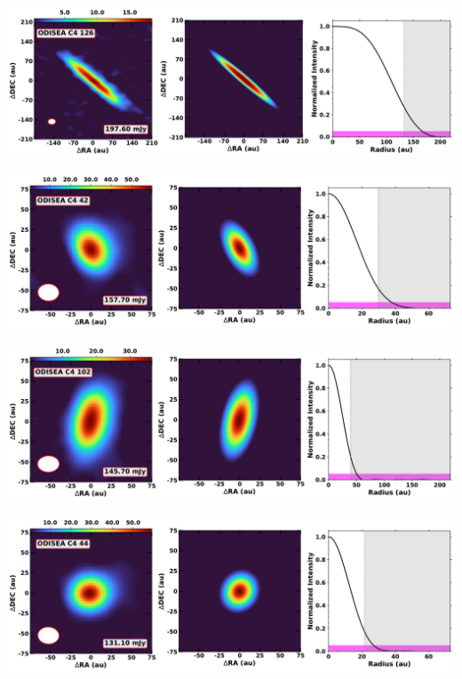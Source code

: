\noindent
\begin{minipage}{.49\textwidth}
	 \centering
	 	 \hrulesep
	 	 \includegraphics[width=1\linewidth]{pdf/0+I_F/081_odisea_c4_126_cutout.pdf}
\end{minipage}%
\vrulesep
\begin{minipage}{.49\textwidth}
	 \centering
	 	 \hrulesep
	 	 \includegraphics[width=1\linewidth]{pdf/0+I_F/075_odisea_c4_42_cutout.pdf}
\end{minipage}%
\vspace{0pt}
\begin{minipage}{.49\textwidth}
	 \centering
	 	 \hrulesep
	 	 \includegraphics[width=1\linewidth]{pdf/0+I_F/074_odisea_c4_102_cutout.pdf}
\end{minipage}%
\vrulesep
\begin{minipage}{.49\textwidth}
	 \centering
	 	 \hrulesep
	 	 \includegraphics[width=1\linewidth]{pdf/0+I_F/071_odisea_c4_44_cutout.pdf}
\end{minipage}%
